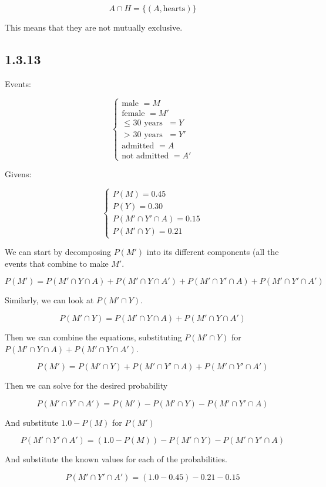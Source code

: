 \documentclass{article}
\begin{document}
\[
A\cap H = \{\left(A, \text{hearts}\right)\}
\]

This means that they are not mutually exclusive.

\subsection*{1.3.13}

Events:

\[
\begin{cases}
\text{male } = M \\
\text{female } = M' \\
\text{$\le$ 30 years } = Y \\
\text{$>$ 30 years } = Y' \\
\text{admitted } = A \\
\text{not admitted } = A'
\end{cases}
\]

Givens:

\[
\begin{cases}
P(M) = 0.45 \\
P(Y) = 0.30 \\
P(M'\cap Y'\cap A) = 0.15 \\
P(M'\cap Y) = 0.21
\end{cases}
\]

We can start by decomposing $P(M')$ into its different components (all
the events that combine to make $M'$.

\[
P(M') = P(M'\cap Y\cap A) + P(M'\cap Y\cap A') + P(M'\cap Y'\cap A) + P(M'\cap Y'\cap A')
\]

Similarly, we can look at $P(M'\cap Y)$.

\[
P(M'\cap Y) = P(M'\cap Y\cap A) + P(M'\cap Y\cap A')
\]

Then we can combine the equations, substituting $P(M'\cap Y)$ for
$P(M'\cap Y\cap A) + P(M'\cap Y\cap A')$.

\[
P(M') = P(M'\cap Y) + P(M'\cap Y'\cap A) + P(M'\cap Y'\cap A')
\]

Then we can solve for the desired probability

\[
P(M'\cap Y'\cap A') = P(M') - P(M'\cap Y) - P(M'\cap Y'\cap A)
\]

And substitute $1.0 - P(M)$ for $P(M')$

\[
P(M'\cap Y'\cap A') = (1.0 - P(M)) - P(M'\cap Y) - P(M'\cap Y'\cap A)
\]

And substitute the known values for each of the probabilities.

\[
P(M'\cap Y'\cap A') = (1.0 - 0.45) - 0.21 - 0.15
\]
\end{document}
